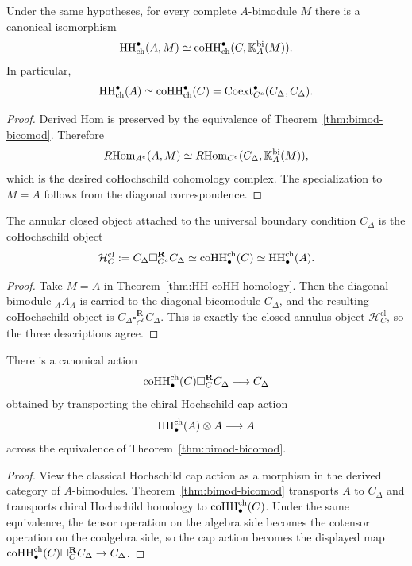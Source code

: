 \begin{theorem}
\ClaimStatusProvedHere
\label{thm:HH-coHH-cohomology}
Under the same hypotheses, for every complete $A$-bimodule $M$ there is a canonical isomorphism
\[
\operatorname{HH}_{\mathrm{ch}}^\bullet(A,M)\simeq
\operatorname{coHH}_{\mathrm{ch}}^\bullet(C,\mathbb{K}_A^{\mathrm{bi}}(M)).
\]
In particular,
\[
\operatorname{HH}_{\mathrm{ch}}^\bullet(A)\simeq
\operatorname{coHH}_{\mathrm{ch}}^\bullet(C)
=
\operatorname{Coext}_{C^e}^\bullet(C_\Delta,C_\Delta).
\]
\end{theorem}

\begin{proof}
Derived Hom is preserved by the equivalence of Theorem~\ref{thm:bimod-bicomod}. Therefore
\[
R\!\operatorname{Hom}_{A^e}(A,M)\simeq R\!\operatorname{Hom}_{C^e}(C_\Delta,\mathbb{K}_A^{\mathrm{bi}}(M)),
\]
which is the desired coHochschild cohomology complex. The specialization to $M=A$ follows from the
diagonal correspondence.
\end{proof}

\begin{corollary}
\ClaimStatusProvedHere
\label{cor:annulus}
The annular closed object attached to the universal boundary condition $C_\Delta$ is the coHochschild
object
\[
\mathcal H_C^{\mathrm{cl}}
:=
C_\Delta \square_{C^e}^{\mathbf R} C_\Delta
\simeq
\operatorname{coHH}^{\mathrm{ch}}_\bullet(C)
\simeq
\operatorname{HH}^{\mathrm{ch}}_\bullet(A).
\]
\end{corollary}

\begin{proof}
Take $M=A$ in Theorem~\ref{thm:HH-coHH-homology}.
Then the diagonal bimodule ${}_AA_A$ is carried to the diagonal
bicomodule $C_\Delta$, and the resulting coHochschild object is
$C_\Delta\square_{C^e}^{\mathbf R}C_\Delta$.
This is exactly the closed annulus object
$\mathcal H_C^{\mathrm{cl}}$, so the three descriptions agree.
\end{proof}

\begin{corollary}
\ClaimStatusProvedHere
\label{cor:cap}
There is a canonical action
\[
\operatorname{coHH}^{\mathrm{ch}}_\bullet(C)\square_C^{\mathbf R} C_\Delta \longrightarrow C_\Delta
\]
obtained by transporting the chiral Hochschild cap action
\[
\operatorname{HH}^{\mathrm{ch}}_\bullet(A)\otimes A\longrightarrow A
\]
across the equivalence of Theorem~\ref{thm:bimod-bicomod}.
\end{corollary}

\begin{proof}
View the classical Hochschild cap action as a morphism in the derived
category of $A$-bimodules.
Theorem~\ref{thm:bimod-bicomod} transports $A$ to $C_\Delta$ and
transports chiral Hochschild homology to
$\operatorname{coHH}^{\mathrm{ch}}_\bullet(C)$.
Under the same equivalence, the tensor operation on the algebra side
becomes the cotensor operation on the coalgebra side, so the cap action
becomes the displayed map
$\operatorname{coHH}^{\mathrm{ch}}_\bullet(C)\square_C^{\mathbf R}C_\Delta\to
C_\Delta$.
\end{proof}

